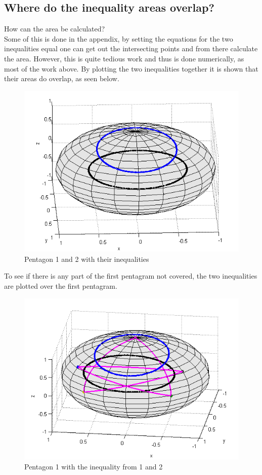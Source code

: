 \subsection{Where do the inequality areas overlap?}
How can the area be calculated?\\
Some of this is done in the appendix, by setting the equations for the two inequalities equal one can get out the intersecting points and from there calculate the area. However, this is quite tedious work and thus is done numerically, as most of the work above.
By plotting the two inequalities together it is shown that their areas do overlap, as seen below.
\begin{figure}[H]
\begin{center}
\includegraphics[scale=0.5]{ine12.png}
\caption{Pentagon 1 and 2 with their inequalities}
\end{center}
\end{figure}
To see if there is any part of the first pentagram not covered, the two inequalities are plotted over the first pentagram.
\begin{figure}[H]
\begin{center}
\includegraphics[scale=0.5]{penta1ine12.png}
\caption{Pentagon 1 with the inequality from 1 and 2}
\end{center}
\end{figure}
